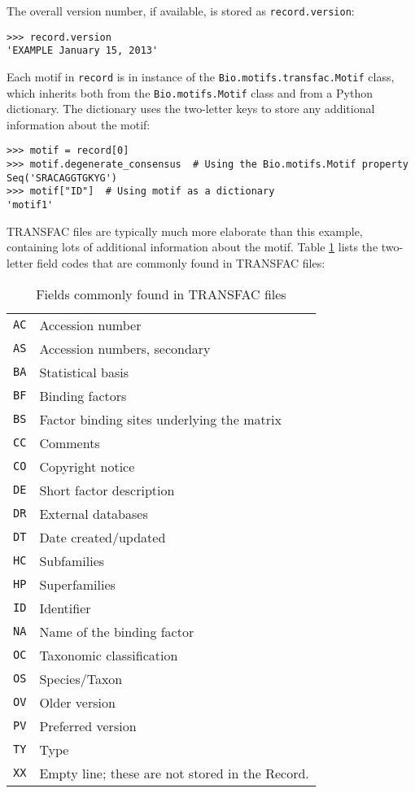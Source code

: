 The overall version number, if available, is stored as \verb+record.version+:

\begin{verbatim}
>>> record.version
'EXAMPLE January 15, 2013'
\end{verbatim}

Each motif in \verb+record+ is in instance of the \verb+Bio.motifs.transfac.Motif+
class, which inherits both from the \verb+Bio.motifs.Motif+ class and
from a Python dictionary. The dictionary uses the two-letter keys to
store any additional information about the motif:

\begin{verbatim}
>>> motif = record[0]
>>> motif.degenerate_consensus  # Using the Bio.motifs.Motif property
Seq('SRACAGGTGKYG')
>>> motif["ID"]  # Using motif as a dictionary
'motif1'
\end{verbatim}

TRANSFAC files are typically much more elaborate than this example, containing
lots of additional information about the motif. Table \ref{table:transfaccodes}
lists the two-letter field codes that are commonly found in TRANSFAC files:
\begin{table}[h]
\caption{Fields commonly found in TRANSFAC files}
\begin{tabular}{|l|l||}
\verb+AC+ & Accession number \\
\verb+AS+ & Accession numbers, secondary \\
\verb+BA+ & Statistical basis \\
\verb+BF+ & Binding factors \\
\verb+BS+ & Factor binding sites underlying the matrix \\
\verb+CC+ & Comments \\
\verb+CO+ & Copyright notice \\
\verb+DE+ & Short factor description \\
\verb+DR+ & External databases \\
\verb+DT+ & Date created/updated \\
\verb+HC+ & Subfamilies \\
\verb+HP+ & Superfamilies \\
\verb+ID+ & Identifier \\
\verb+NA+ & Name of the binding factor \\
\verb+OC+ & Taxonomic classification \\
\verb+OS+ & Species/Taxon \\
\verb+OV+ & Older version \\
\verb+PV+ & Preferred version \\
\verb+TY+ & Type \\
\verb+XX+ & Empty line; these are not stored in the Record. \\
\end{tabular}
\label{table:transfaccodes}
\end{table}

